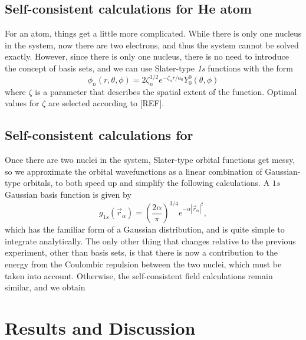 \documentclass[journal=jacsat,manuscript=communication]{achemso}
\begin{document}
\begin{Abstract}
\subsection{Self-consistent calculations for He atom}
For an  atom, things get a little more complicated.  While there is only one nucleus in the system, now there are two electrons, and thus the system cannot be solved exactly.  However, since there is only one nucleus, there is no need to introduce the concept of basis sets, and we can use Slater-type \textit{1s} functions with the form 
\begin{equation}
	\phi_n(r,\theta,\phi) = 2\zeta_n^{3/2}e^{-\zeta_nr/a_0}Y_0^0(\theta,\phi)
\end{equation}
where $\zeta$ is a parameter that describes the spatial extent of the function.  Optimal values for $\zeta$ are selected according to [REF].


\subsection{Self-consistent calculations for }
Once there are two nuclei in the system, Slater-type orbital functions get messy, so we approximate the orbital wavefunctions as a linear combination of Gaussian-type orbitals, to both speed up and simplify the following calculations.  A $1s$ Gaussian basis function is given by
\begin{equation}
	g_{1s}(\vec{r}_\alpha)=\left(\frac{2\alpha}{\pi}\right)^{3/4}e^{-\alpha|\vec{r}_\alpha|^2},
\end{equation}
which has the familiar form of a Gaussian distribution, and is quite simple to integrate analytically.  The only other thing that changes relative to the previous experiment, other than basis sets, is that there is now a contribution to the energy from the Coulombic repulsion between the two nuclei, which must be taken into account.  Otherwise, the self-consistent field calculations remain similar, and we obtain 
\section{Results and Discussion}

\end{Abstract}
\end{document}
